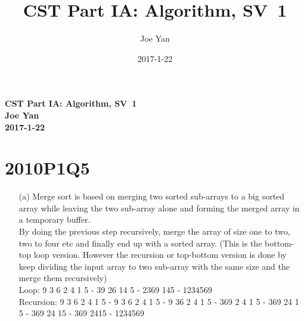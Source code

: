 \documentclass[10pt,twoside,a4paper]{article}
\newcommand{\studentname}{Joe Yan}
\newcommand{\svworkdate}{2017-1-22}
\newcommand{\svcourse}{CST Part IA: Algorithm}
\newcommand{\svnumber}{1}
\begin{document}
\author{\studentname}
\title{\svcourse, SV~\svnumber}
\date{\svworkdate}

\textbf{\svcourse, SV~\svnumber}\\
\textbf{\studentname}\\
\textbf{\svworkdate}\\

\section{2010P1Q5}

\begin{itemize}
\item[(a)]
Merge sort is based on merging two sorted sub-arrays to a big sorted array while leaving the two sub-array alone and forming the merged array in a temporary buffer.\\
By doing the previous step recursively, merge the array of size one to two, two to four etc and finally end up with a sorted array. (This is the bottom-top loop version. However the recursion or top-bottom version is done by keep dividing the input array to two sub-array with the same size and the merge them recursively)\\
Loop: 9 3 6 2 4 1 5 - 39 26 14 5 - 2369 145 - 1234569\\
Recursion: 9 3 6 2 4 1 5 - 9 3 6 2 4 1 5 - 9 36 2 4 1 5 - 369 2 4 1 5 - 369 24 1 5 - 369 24 15 - 369 2415 - 1234569\\


\end{itemize}
\end{document}
